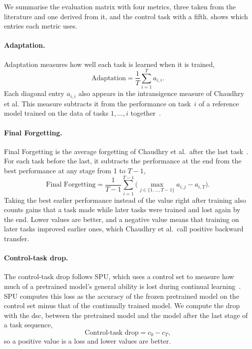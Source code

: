 We summarise the evaluation matrix with four metrics, three taken from the literature and one derived from it, and the control task with a fifth.
 shows which entries each metric uses.

\paragraph{Adaptation.}
Adaptation measures how well each task is learned when it is trained,
\begin{equation}
\text{Adaptation} = \frac{1}{T} \sum_{i=1}^{T} a_{i,i}.
\label{eq:bg-adaptation}
\end{equation}
Each diagonal entry $a_{i,i}$ also appears in the intransigence measure of Chaudhry et al.
This measure subtracts it from the performance on task~$i$ of a reference model trained on the data of tasks $1, \dots, i$ together~\cite[Sec.~3, Eq.~4]{Chaudhry_2018}.

\paragraph{Final Forgetting.}
Final Forgetting is the average forgetting of Chaudhry et al.\ after the last task~\cite[Sec.~3, Eq.~3]{Chaudhry_2018}.
For each task before the last, it subtracts the performance at the end from the best performance at any stage from 1 to $T-1$,
\begin{equation}
\text{Final Forgetting} = \frac{1}{T-1} \sum_{i=1}^{T-1} \Big( \max_{j \in \{1, \dots, T-1\}} a_{i,j} - a_{i,T} \Big).
\label{eq:bg-forgetting}
\end{equation}
Taking the best earlier performance instead of the value right after training also counts gains that a task made while later tasks were trained and lost again by the end.
Lower values are better, and a negative value means that training on later tasks improved earlier ones, which Chaudhry et al.\ call positive backward transfer.

\paragraph{Control-task drop.}
The control-task drop follows SPU, which uses a control set to measure how much of a pretrained model's general ability is lost during continual learning~\cite[Sec.~5.1, Eq.~6]{Zhang_2024_CVPR}.
SPU computes this loss as the accuracy of the frozen pretrained model on the control set minus that of the continually trained model.
We compute the drop with the \gls{dsc}, between the pretrained model and the model after the last stage of a task sequence,
\begin{equation}
\text{Control-task drop} = c_0 - c_T,
\label{eq:bg-control-drop}
\end{equation}
so a positive value is a loss and lower values are better.

